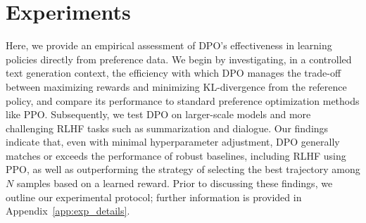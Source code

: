 \section{Experiments}
Here, we provide an empirical assessment of DPO’s effectiveness in learning policies directly from preference data. We begin by investigating, in a controlled text generation context, the efficiency with which DPO manages the trade-off between maximizing rewards and minimizing KL-divergence from the reference policy, and compare its performance to standard preference optimization methods like PPO. Subsequently, we test DPO on larger-scale models and more challenging RLHF tasks such as summarization and dialogue. Our findings indicate that, even with minimal hyperparameter adjustment, DPO generally matches or exceeds the performance of robust baselines, including RLHF using PPO, as well as outperforming the strategy of selecting the best trajectory among $N$ samples based on a learned reward. Prior to discussing these findings, we outline our experimental protocol; further information is provided in Appendix~\ref{app:exp_details}.


